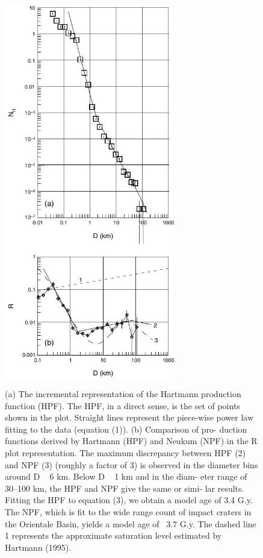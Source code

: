 \documentclass[11pt]{article}
\begin{document}
\begin{figure}[H]
	\centering
	\includegraphics[width=75mm,height=170mm,  scale=0.8]{files/lunar_functions/HPF.jpg}
	\caption{(a) The incremental representation of the Hartmann production function (HPF). The HPF, in a direct sense, is the set of
		points shown in the plot. Straight lines represent the piece-wise
		power law fitting to the data (equation (1)). (b) Comparison of pro-
		duction functions derived by Hartmann (HPF) and Neukum (NPF)
		in the R plot representation. The maximum discrepancy between
		HPF (2) and NPF (3) (roughly a factor of 3) is observed in the
		diameter bins around D ~ 6 km. Below D ~ 1 km and in the diam-
		eter range of 30–100 km, the HPF and NPF give the same or simi-
		lar results. Fitting the HPF to equation (3), we obtain a model age
		of 3.4 G.y. The NPF, which is fit to the wide range count of impact
		craters in the Orientale Basin, yields a model age of ~3.7 G.y. The
		dashed line 1 represents the approximate saturation level estimated
		by Hartmann (1995).}
	\label{HPF}
\end{figure}
\end{document}
